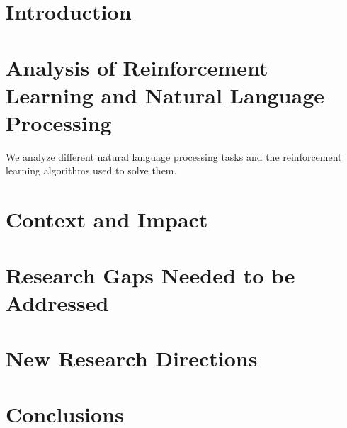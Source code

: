 \documentclass[jair,twoside,11pt,theapa]{article}
\begin{document}
\section{Introduction}
\label{Introduction}

\section{Analysis of Reinforcement Learning and Natural Language Processing}
\label{Analysis}
We analyze different natural language processing tasks and the reinforcement learning algorithms used to solve them.

\section{Context and Impact }
\label{Context}

\section{Research Gaps Needed to be Addressed}
\label{Gaps}

\section{New Research Directions}
\label{Research}

\section{Conclusions}
\label{Conclusions}

\cite{Levin1997}
\cite{Singh1999}
\cite{Walker2000}
\cite{Oh2000}
\cite{Singh2000}
\cite{Levin2000}
\cite{Ratnaparkhi2002}
\cite{Singh2002}
\cite{Schatzmann2006}
\cite{Young2010}
\cite{Vogel2010}
\cite{Dethlefs2011a}
\cite{Dethlefs2011b}
\cite{Branavan2012}
\cite{Banchs2012}
\cite{Gasic2013a}
\cite{Gasic2013b}
\cite{Young2013}
\cite{Nio2014}
\cite{Gasic2014}
\cite{Guo2015}
\cite{Narasimhan2015}
\cite{Li2016}
\cite{He2016}
  

\vskip 0.2in


\end{document}
